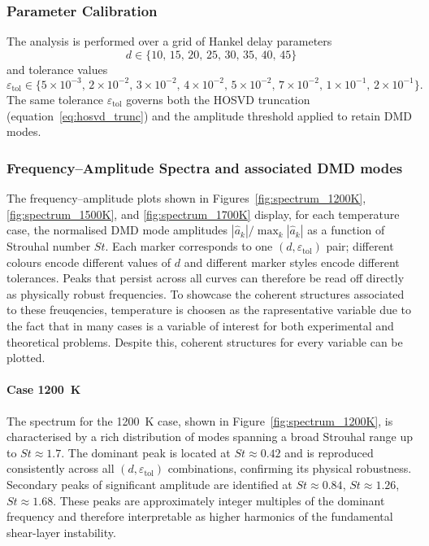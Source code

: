 \subsubsection{Parameter Calibration}
\label{sec:coria_params}

The analysis is performed over a grid of Hankel delay parameters
\begin{equation}
    d \in \{10,\, 15,\, 20,\, 25,\, 30,\, 35,\, 40,\, 45\}
    \label{eq:d_values}
\end{equation}
and tolerance values
\begin{equation}
    \varepsilon_{\mathrm{tol}} \in
    \{5\times10^{-3},\, 2\times10^{-2},\, 3\times10^{-2},\, 4\times10^{-2},\,
      5\times10^{-2},\, 7\times10^{-2},\, 1\times10^{-1},\, 2\times10^{-1}\}.
    \label{eq:tol_values}
\end{equation}
The same tolerance $\varepsilon_{\mathrm{tol}}$ governs both the HOSVD truncation (equation~\eqref{eq:hosvd_trunc}) and the amplitude threshold applied to retain DMD modes.

\subsubsection{Frequency--Amplitude Spectra and associated DMD modes}
\label{sec:freq_amplitude}

The frequency--amplitude plots shown in Figures~\ref{fig:spectrum_1200K}, \ref{fig:spectrum_1500K}, and \ref{fig:spectrum_1700K} display, for each temperature case, the normalised DMD mode amplitudes $|\hat{a}_k| / \max_k |\hat{a}_k|$ as a function of Strouhal number $St$. Each marker corresponds to one $(d, \varepsilon_{\mathrm{tol}})$ pair; different colours encode different values of $d$ and different marker styles encode different tolerances. Peaks that persist across all curves can therefore be read off directly as physically robust frequencies. To showcase the coherent structures associated to these freuqencies, temperature is choosen as the rapresentative variable due to the fact that in many cases is a variable of interest for both experimental and theoretical problems. Despite this, coherent structures for every variable can be plotted.

\paragraph{Case 1200~K}
\label{sec:spectrum_1200K}

The spectrum for the 1200~K case, shown in Figure~\ref{fig:spectrum_1200K}, is characterised by a rich distribution of modes spanning a broad Strouhal range up to $St \approx 1.7$. The dominant peak is located at $St \approx 0.42$ and is reproduced consistently across all $(d, \varepsilon_{\mathrm{tol}})$ combinations, confirming its physical robustness. Secondary peaks of significant amplitude are identified at $St \approx 0.84$, $St \approx 1.26$, $St \approx 1.68$. These peaks are approximately integer multiples of the dominant frequency and therefore interpretable as higher harmonics of the fundamental shear-layer instability. 

